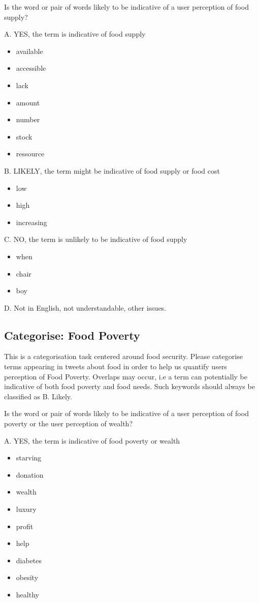 Is the word or pair of words likely to be indicative of a user perception of food supply?


A. YES, the term is indicative of food supply


\begin{itemize}
  \item available 
  \item accessible 
    \item lack 
  \item amount 
  \item number 
   \item stock 
   \item ressource 
\end{itemize}

B. LIKELY, the term might be indicative of food supply or food cost
\begin{itemize}
  \item low
  \item high 
  \item increasing  
\end{itemize}

C. NO, the term is unlikely to be indicative of food supply 
\begin{itemize}
  \item when
  \item chair
  \item boy
\end{itemize}

D. Not in English, not understandable, other issues.



\subsection{Categorise: Food Poverty}

This is a categorisation task centered around food security. Please categorise terms appearing in tweets about food in order to help us quantify users perception of Food Poverty. Overlaps may occur, i.e a term can potentially be indicative of both food poverty and food needs. Such keywords should always be classified as B. Likely.

Is the word or pair of words likely to be indicative of a user perception of food poverty or the user perception of wealth?

A. YES, the term is indicative of food poverty or wealth

\begin{itemize}

  \item starving
  \item donation
  \item wealth 
  \item luxury
  \item profit
  \item help
  \item diabetes
  \item obesity
  \item healthy

\end{itemize}

